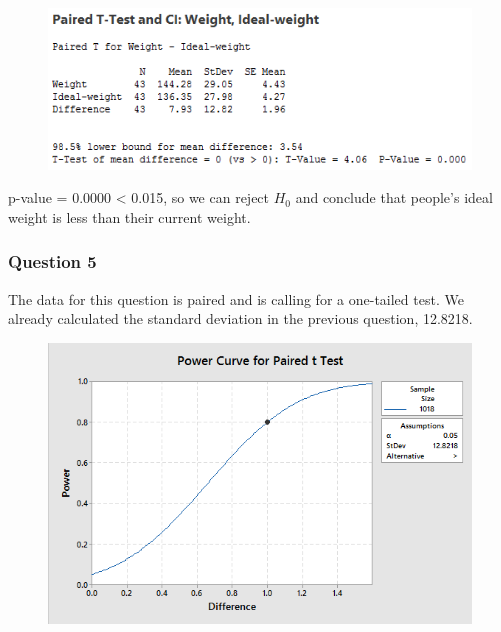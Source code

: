 \documentclass{article}
\begin{document}
    \begin{figure}[h!]
 \centering
 \includegraphics[scale=.7,keepaspectratio=true]{./project_files/paired-data_t-test_weight-vs-ideal-weight.png}
\end{figure}


p-value = 0.0000 \textless{} 0.015, so we can reject \(H_0\) and
conclude that people's ideal weight is less than their current weight.

    \subsubsection{Question 5}\label{question-5}

The data for this question is paired and is calling for a one-tailed
test. We already calculated the standard deviation in the previous
question, 12.8218.

\begin{figure}[h!]
 \centering
 \includegraphics[scale=.7,keepaspectratio=true]{./project_files/pair-data_power-curve.png}
\end{figure}
\end{document}
